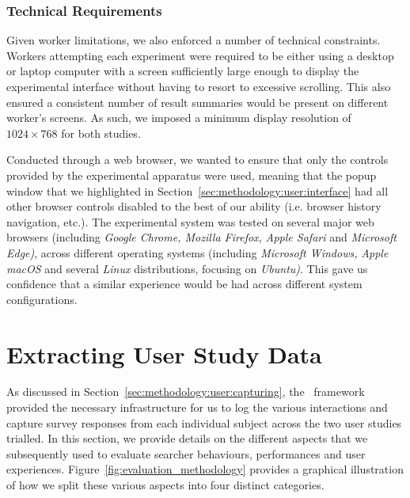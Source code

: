 \subsubsection{Technical Requirements}\label{sec:methodology:user:crowdsourcing:technical}
Given worker limitations, we also enforced a number of technical constraints. Workers attempting each experiment were required to be either using a desktop or laptop computer with a screen sufficiently large enough to display the experimental interface without having to resort to excessive scrolling. This also ensured a consistent number of result summaries would be present on different worker's screens. As such, we imposed a minimum display resolution of $1024 \times 768$ for both studies. 

Conducted through a web browser, we wanted to ensure that only the controls provided by the experimental apparatus were used, meaning that the popup window that we highlighted in Section~\ref{sec:methodology:user:interface} had all other browser controls disabled to the best of our ability (i.e. browser history navigation, etc.). The experimental system was tested on several major web browsers (including \emph{Google Chrome, Mozilla Firefox,} \emph{Apple Safari} and \emph{Microsoft Edge)}, across different operating systems (including \emph{Microsoft Windows,} \emph{Apple macOS} and several \emph{Linux} distributions, focusing on \emph{Ubuntu)}. This gave us confidence that a similar experience would be had across different system configurations.

\section{Extracting User Study Data}\label{sec:methodology:extracting}
As discussed in Section~\ref{sec:methodology:user:capturing}, the \treconomics~framework provided the necessary infrastructure for us to log the various interactions and capture survey responses from each individual subject across the two user studies trialled. In this section, we provide details on the different aspects that we subsequently used to evaluate searcher behaviours, performances and user experiences. Figure~\ref{fig:evaluation_methodology} provides a graphical illustration of how we split these various aspects into four distinct categories.

